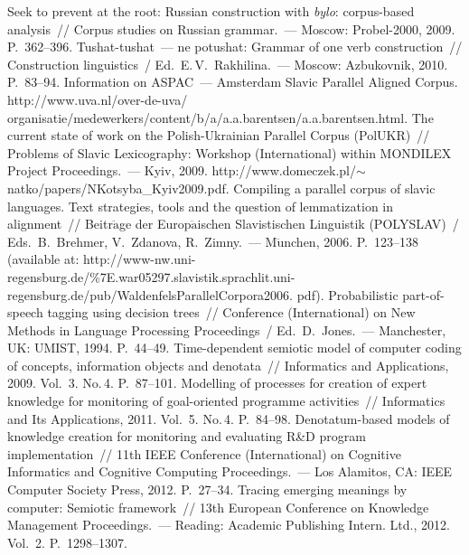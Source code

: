 \begin{multicols}{2}
{{\begin{thebibliography}{99}
 Seek to prevent at the root: Russian construction with \textit{bylo}: 
corpus-based analysis~// Corpus studies on 
Russian grammar.~--- Moscow: Probel-2000, 2009. P.~362--396.
 Tushat-tushat~--- ne potushat: Grammar of one verb 
construction~// Construction linguistics~/ Ed.\ E.\,V.~Rakhilina.~--- 
Moscow: Azbukovnik, 2010. P.~83--94.
Information on ASPAC~--- Amsterdam Slavic Parallel Aligned Corpus. {\sf 
http://www.uva.nl/over-de-uva/\linebreak 
organisatie/medewerkers/content/b/a/a.a.barentsen/\linebreak  a.a.barentsen.html}.
 The current state of work on the Polish-Ukrainian Parallel Corpus (PolUKR)~// 
Problems of Slavic Lexicography:  Workshop (International) within MONDILEX Project 
Proceedings.~--- Kyiv, 2009. {
\sf http://www.domeczek.pl/$\sim$natko/papers/NKotsyba\_\linebreak Kyiv2009.pdf}.
 Compiling a parallel corpus of slavic languages. Text strategies, tools and 
the question of lemmatization in alignment~// Beitr$\ddot{\mbox{a}}$ge der 
Europ$\ddot{\mbox{a}}$ischen Slavistischen Linguistik (POLYSLAV)~/ Eds.\ B.~Brehmer,  
V.~Zdanova,  R.~Zimny.~--- M$\ddot{\mbox{u}}$nchen, 2006.  P.~123--138 (available at: 
{\sf 
http://www-nw.uni-\linebreak 
regensburg.de/\%7E.war05297.slavistik.sprachlit.uni-regensburg.de/pub/WaldenfelsParallelCorpora2006.\linebreak
pdf}).
 Probabilistic part-of-speech tagging using decision trees~// Conference 
(International) on New Methods in Language Processing Proceedings~/ Ed.\  D.~Jones.~--- 
Manchester, UK: UMIST, 1994. P.~44--49.
 Time-dependent semiotic model of computer coding of concepts, information 
objects and denotata~// Informatics and Applications, 2009. Vol.~3. No.\,4. P.~87--101.
 Modelling of processes for creation of expert knowledge for 
monitoring of goal-oriented programme activities~// Informatics and Its Applications, 2011. Vol.~5. 
No.\,4. P.~84--98.
 Denotatum-based models of knowledge creation for monitoring and evaluating 
R\&D program implementation~// 11th IEEE Conference (International) on Cognitive Informatics 
and Cognitive Computing Proceedings.~--- Los Alamitos, CA: IEEE Computer Society Press, 2012. 
P.~27--34.
 Tracing emerging meanings by computer: Semiotic framework~// 13th European 
Conference on Knowledge Management Proceedings.~--- Reading: Academic Publishing 
Intern. Ltd., 2012. Vol.~2. P.~1298--1307.
\end{thebibliography}

}
}


\end{multicols}



